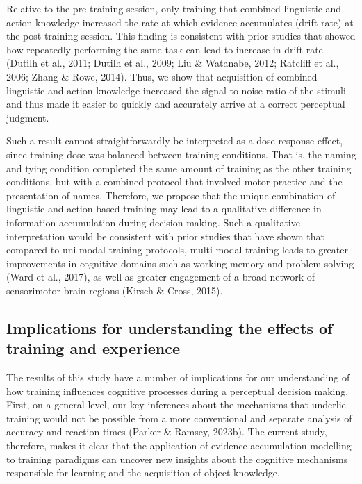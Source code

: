 \documentclass[
  english,
  man, donotrepeattitle,floatsintext]{apa6}
\begin{document}
Relative to the pre-training session, only training that combined linguistic and action knowledge increased the rate at which evidence accumulates (drift rate) at the post-training session. This finding is consistent with prior studies that showed how repeatedly performing the same task can lead to increase in drift rate (Dutilh et al., 2011; Dutilh et al., 2009; Liu \& Watanabe, 2012; Ratcliff et al., 2006; Zhang \& Rowe, 2014). Thus, we show that acquisition of combined linguistic and action knowledge increased the signal-to-noise ratio of the stimuli and thus made it easier to quickly and accurately arrive at a correct perceptual judgment.

Such a result cannot straightforwardly be interpreted as a dose-response effect, since training dose was balanced between training conditions. That is, the naming and tying condition completed the same amount of training as the other training conditions, but with a combined protocol that involved motor practice and the presentation of names. Therefore, we propose that the unique combination of linguistic and action-based training may lead to a qualitative difference in information accumulation during decision making. Such a qualitative interpretation would be consistent with prior studies that have shown that compared to uni-modal training protocols, multi-modal training leads to greater improvements in cognitive domains such as working memory and problem solving (Ward et al., 2017), as well as greater engagement of a broad network of sensorimotor brain regions (Kirsch \& Cross, 2015).

\subsection{Implications for understanding the effects of training and experience}\label{implications-for-understanding-the-effects-of-training-and-experience}

The results of this study have a number of implications for our understanding of how training influences cognitive processes during a perceptual decision making. First, on a general level, our key inferences about the mechanisms that underlie training would not be possible from a more conventional and separate analysis of accuracy and reaction times (Parker \& Ramsey, 2023b). The current study, therefore, makes it clear that the application of evidence accumulation modelling to training paradigms can uncover new insights about the cognitive mechanisms responsible for learning and the acquisition of object knowledge.
\end{document}
